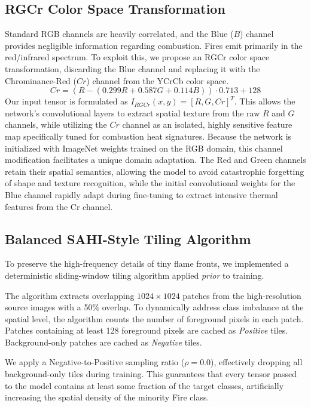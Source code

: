 \documentclass[conference]{IEEEtran}
\begin{document}
\subsection{RGCr Color Space Transformation}
Standard RGB channels are heavily correlated, and the Blue ($B$) channel provides negligible information regarding combustion. Fires emit primarily in the red/infrared spectrum. To exploit this, we propose an RGCr color space transformation, discarding the Blue channel and replacing it with the Chrominance-Red ($Cr$) channel from the YCrCb color space. 
\begin{equation}
    Cr = (R - (0.299R + 0.587G + 0.114B)) \cdot 0.713 + 128
\end{equation}
Our input tensor is formulated as $I_{RGCr}(x,y) = [R, G, Cr]^T$. This allows the network's convolutional layers to extract spatial texture from the raw $R$ and $G$ channels, while utilizing the $Cr$ channel as an isolated, highly sensitive feature map specifically tuned for combustion heat signatures. Because the network is initialized with ImageNet weights trained on the RGB domain, this channel modification facilitates a unique domain adaptation. The Red and Green channels retain their spatial semantics, allowing the model to avoid catastrophic forgetting of shape and texture recognition, while the initial convolutional weights for the Blue channel rapidly adapt during fine-tuning to extract intensive thermal features from the Cr channel.

\subsection{Balanced SAHI-Style Tiling Algorithm}
To preserve the high-frequency details of tiny flame fronts, we implemented a deterministic sliding-window tiling algorithm applied \textit{prior} to training. 

The algorithm extracts overlapping $1024 \times 1024$ patches from the high-resolution source images with a 50\% overlap. To dynamically address class imbalance at the spatial level, the algorithm counts the number of foreground pixels in each patch. Patches containing at least 128 foreground pixels are cached as \textit{Positive} tiles. Background-only patches are cached as \textit{Negative} tiles. 

We apply a Negative-to-Positive sampling ratio ($\rho = 0.0$), effectively dropping all background-only tiles during training. This guarantees that every tensor passed to the model contains at least some fraction of the target classes, artificially increasing the spatial density of the minority Fire class.
\end{document}
